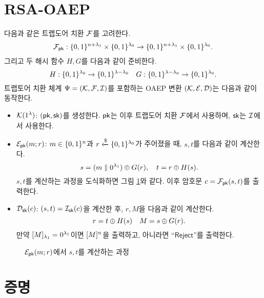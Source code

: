 \documentclass{article}
\theoremstyle{definition}
\begin{document}
\section{RSA-OAEP}
다음과 같은 트랩도어 치환 $\td$를 고려한다.
$$
	\td_{\pk}: \set{0, 1}^{\mlen + \sp_1} \times \set{0, 1}^{\sp_0} \to \set{0, 1}^{\mlen + \sp_1} \times \set{0, 1}^{\sp_0}.
$$
그리고 두 해시 함수 $H, G$를 다음과 같이 준비한다.
$$
	\hash: \set{0, 1}^{\sp_0} \to \set{0, 1}^{\sp - \sp_0} \quad
	\gash: \set{0, 1}^{\sp - \sp_0} \to \set{0, 1}^{\sp_0}.
$$
트랩토어 치환 체계 $\tdsch = (\genkey, \td, \itd)$를 포함하는 OAEP 변환
$(\genkey, \enc, \dec)$는 다음과 같이 동작한다.
\begin{itemize}
	\item $\genkey(1^{\sp})$: $(\pk, \sk)$를 생성한다. $\pk$는 이후 트랩도어 치환
	$\td$에서 사용하며, $\sk$는 $\itd$에서 사용한다.
	\item $\enc_{\pk}(\msg; \coin)$: $\msg \in \set{0, 1}^{\mlen}$과 $\coin
	\rgets \set{0, 1}^{\sp_0}$가 주어졌을 때, $s, t$를 다음과 같이 계산한다.
	$$
		s = (\msg \parallel 0^{\sp_1}) \xor \gash(\coin), \quad
		t = \coin \xor \hash(s).
	$$
	$s, t$를 계산하는 과정을 도식화하면 그림 \ref{fig:oaep}와 같다. 이후 암호문
	$\ct = \td_{\pk}(s, t)$를 출력한다.
  	\item $\dec_{\sk}(\ct)$: $(s,t) = \itd_{\sk}(\ct)$을 계산한 후, $r, M$을 다음과
  	같이 계산한다.
	$$
    	r = t \xor \hash(s) \quad M = s \xor \gash(\coin).
	$$
  	만약 $[M]_{\sp_1} = 0^{\sp_1}$이면 $[M]^{\mlen}$을 출력하고, 아니라면
  	“$\textsf{Reject}$”를 출력한다.
\end{itemize}

\begin{figure}[ht]
	\centering
	\caption{$\enc_{\pk}(\msg; \coin)$에서 $s, t$를 계산하는 과정}
	\label{fig:oaep}
\end{figure}

\section{증명}
\end{document}
